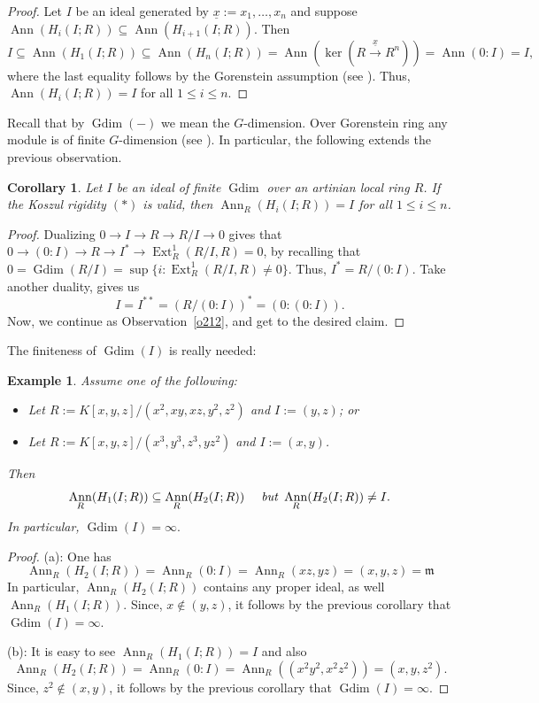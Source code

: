 \documentclass[11pt,a4paper]{amsart}
\numberwithin{equation}{section}
\newtheorem{corollary}[theorem]{Corollary}
\newtheorem{example}[theorem]{Example}
\DeclareMathOperator{\Gdim}{Gdim}
\DeclareMathOperator{\Ann}{Ann}\DeclareMathOperator{\ann}{Ann}
\DeclareMathOperator{\Ext}{Ext}
\newcommand{\fm}{\mathfrak{m}}
\newcommand{\lo}{\longrightarrow}
\begin{document}
\begin{proof}
	Let $I$ be an ideal generated by $\underline{x}:=x_1,\ldots,x_n$  and suppose  
	$\Ann(H_i(I; R))\subseteq\Ann(H_{i+1}(I; R))$. Then $$I\subseteq\Ann(H_1(I; R))\subseteq\Ann(H_n(I; R))=\Ann(\ker(R\stackrel{\underline{x}}\lo R^n))=\Ann(0:I)=I,$$where the last equality follows by the Gorenstein assumption (see \cite[eX. 3.2.15]{BH}). Thus, $\Ann(H_i(I; R))=I$ for all $1\leq i\leq n$.
\end{proof}



Recall that by $\Gdim(-)$ we mean the $G$-dimension.
Over Gorenstein ring any module is of finite $G$-dimension (see \cite{ab}). In particular, the following extends the previous observation.

\begin{corollary}\label{c213}
	Let $I$  be an ideal of finite $\Gdim$ over an artinian local ring $R$.
	If the  Koszul rigidity $(\ast)$ is valid, then   $\Ann_R(H_i(I; R))=I$ for all $1\leq i\leq n$.
\end{corollary}

\begin{proof}
	Dualizing $0\to I\to R\to R/I\to 0$ gives that
	$0\to (0:I)\to R\to I^\ast\to \Ext_{R}^1(R/I,R)=0$, by recalling that $0=\Gdim(R/I)=\sup\{i:\Ext_{R}^1(R/I,R)\neq0\}$. Thus, $I^\ast=R/(0:I)$. Take another duality, gives us $$I=I^{\ast\ast}=(R/(0:I))^\ast=(0:(0:I)).$$ Now, we continue as {Observation}~\ref{o212}, and get to the desired claim.
\end{proof}

The finiteness of $\Gdim(I)$ is really needed:

\begin{example}
	Assume one of the following: 
	\begin{itemize}
		\item[(a)]   Let  $R:=K[x,y,z]/(x^2,xy,xz,y^2, z^2)$ and $I:=(y,z)$; or
		
		\item[(b)]   Let $R:=K[x,y,z]/(x^3,y^3,z^3,yz^2)$ and   $I:=(x,y)$.
		
	\end{itemize}
	Then 
	$$\Ann_R(H_1(I; R))\subseteq \Ann_R(H_2(I; R))\quad \emph{ but } \Ann_R(H_2(I; R))\neq I.$$In particular,  $\Gdim(I)=\infty.$
\end{example}

\begin{proof}
	(a): One has	$$\Ann_R(H_2(I; R))=\Ann_R(0:I)=\Ann_R(xz,yz)=(x,y,z)=\fm$$
	In particular, $\Ann_R(H_2(I; R))$ contains any proper ideal, as well
	$\Ann_R(H_1(I; R))$. Since, $x\notin (y,z)$, it follows by the previous corollary that $\Gdim(I)=\infty.$
	
	(b): It is easy to see $\Ann_R(H_1(I; R))=I$ and also  $$\Ann_R(H_2(I; R))=\Ann_R(0:I)=\Ann_R((x^2y^2,x^2z^2))=(x,y,z^2).$$
	Since, $z^2\notin (x,y)$, it follows by the previous corollary that $\Gdim(I)=\infty.$
\end{proof}
\end{document}
